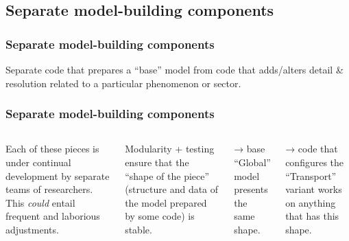 \documentclass[12pt,aspectratio=169]{beamer}
\newcommand{\side}[1]{
(0.0,#1*0.00) .. controls (0.0,#1* 0.00) and (0.4,#1*-0.04) ..
(0.4,#1*0.04) .. controls (0.4,#1* 0.11) and (0.2,#1* 0.26) ..
(0.5,#1*0.26) .. controls (0.8,#1* 0.26) and (0.6,#1* 0.11) ..
(0.6,#1*0.04) .. controls (0.6,#1*-0.04) and (1.0,#1* 0.00) ..
(1.0,#1*0.00)
}
\newcommand{\piece}[2][black]{
\begin{scope}[scale=2, shift={($(#2) - (0.25,0.48)$)}]
  \path [draw = #1, ultra thick, line cap = round]
  \side{1}  %
  [rotate around={90:(0.5,0.5)}] \side{1}    %
  [rotate around={180:(0.5,0.5)}] \side{-1}  %
  [rotate around={270:(0.5,0.5)}] \side{-1};  %
\end{scope}
}
\begin{document}
\subsection{Separate model-building components}
\begin{frame}
\frametitle{Separate model-building components}

Separate code that prepares a “base” model from code that adds/alters detail \& resolution related to a particular phenomenon or sector.

\bigskip
{}

\end{frame}

\begin{frame}
\frametitle{Separate model-building components}

\begin{columns}
\column{0.3\paperwidth}

\column{0.6\paperwidth}
Each of these pieces is under continual development by separate teams of researchers.
This \emph{could} entail frequent and laborious adjustments.

\bigskip
\pause Modularity + testing ensure that the “shape of the piece” (structure and data of the model prepared by some code) is stable.

\smallskip
\pause → base “Global” model presents the same shape.

\pause → code that configures the “Transport” variant works on anything that has this shape.
\end{columns}
\end{frame}
\end{document}
